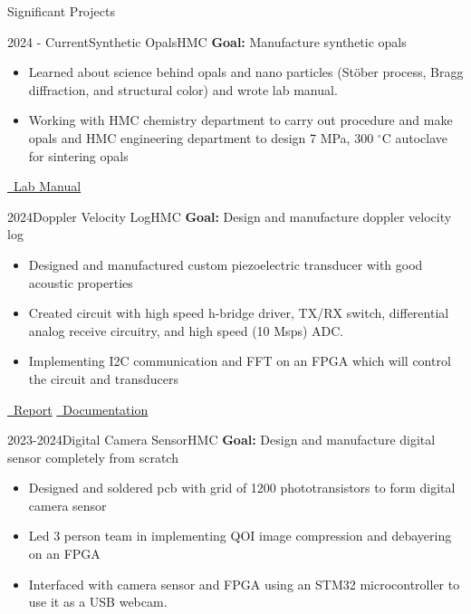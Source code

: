 \documentclass[]{mcdowellcv}
\begin{document}
\begin{cvsection}{Significant Projects}
	\begin{cvsubsection}{2024 - Current}{Synthetic Opals}{HMC}
		\textbf{Goal:} Manufacture synthetic opals
		\begin{itemize}
			\item Learned about science behind opals and nano particles (St\"ober process, Bragg diffraction, and structural color) and wrote lab manual.
			\item Working with HMC chemistry department to carry out procedure and make opals and HMC engineering department to design 7 MPa, 300 $^\circ$C autoclave for sintering opals
		\end{itemize}
		\href{https://kavidey.notion.site/SNPs-Synthetic-Opals-Lab-Manual-648f35746e4c405987239699e7e6bfce?pvs=4/}{\faBook \ Lab Manual}
	\end{cvsubsection}
	\begin{cvsubsection}{2024}{\hypertarget{doppler_velocity_log}{Doppler Velocity Log}}{HMC}
		\textbf{Goal:} Design and manufacture doppler velocity log
		\begin{itemize}
			\item Designed and manufactured custom piezoelectric transducer with good acoustic properties
			\item Created circuit with high speed h-bridge driver, TX/RX switch, differential analog receive circuitry, and high speed (10 Msps) ADC.
			\item Implementing I2C communication and FFT on an FPGA which will control the circuit and transducers
		\end{itemize}
		\href{https://kavidey.com/assets/projects/dvl/e80_report.pdf}{\faBook \ Report}
		\href{https://docs.google.com/document/d/18yRygu0o4ie6aZtUGPSXawOBYlJCxya42LHkkw6iH5E/edit}{\faBook \ Documentation}
	\end{cvsubsection}
	\begin{cvsubsection}{2023-2024}{Digital Camera Sensor}{HMC}
		\textbf{Goal:} Design and manufacture digital sensor completely from scratch
		\begin{itemize}
			\item Designed and soldered pcb with grid of 1200 phototransistors to form digital camera sensor
			\item Led 3 person team in implementing QOI image compression and debayering on an FPGA
			\item Interfaced with camera sensor and FPGA using an STM32 microcontroller to use it as a USB webcam.

\end{itemize}
\end{cvsubsection}
\end{cvsection}
\end{document}
